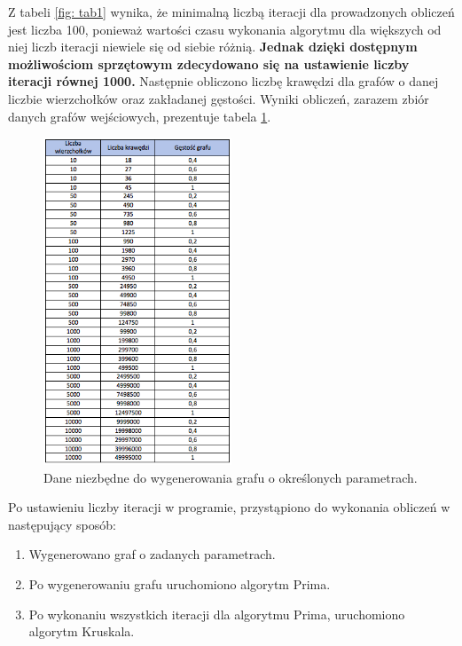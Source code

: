 Z tabeli \ref{fig: tab1} wynika, że minimalną liczbą iteracji dla prowadzonych obliczeń jest liczba 100, ponieważ  wartości czasu wykonania algorytmu dla większych od niej liczb iteracji niewiele się od siebie różnią. \textbf{Jednak dzięki dostępnym możliwościom sprzętowym zdecydowano się na ustawienie liczby iteracji równej 1000.}
\newpage
Następnie obliczono liczbę krawędzi dla grafów o danej liczbie wierzchołków oraz zakładanej gęstości. Wyniki obliczeń, zarazem zbiór danych grafów wejściowych, prezentuje tabela \ref{fig: tab2}.

\begin{figure}[htb!]
	\centering
	\includegraphics[width=0.5\textwidth]{tex/fig/tab2}
	\caption{Dane niezbędne do wygenerowania grafu o określonych parametrach.}
	\label{fig: tab2}
\end{figure}

\newpage 
Po ustawieniu liczby iteracji w programie, przystąpiono do wykonania obliczeń w następujący sposób:
\begin{enumerate}
	\item Wygenerowano graf o zadanych parametrach.
	\item Po wygenerowaniu grafu uruchomiono algorytm Prima.
	\item Po wykonaniu wszystkich iteracji dla algorytmu Prima, uruchomiono algorytm Kruskala.
\end{enumerate}


